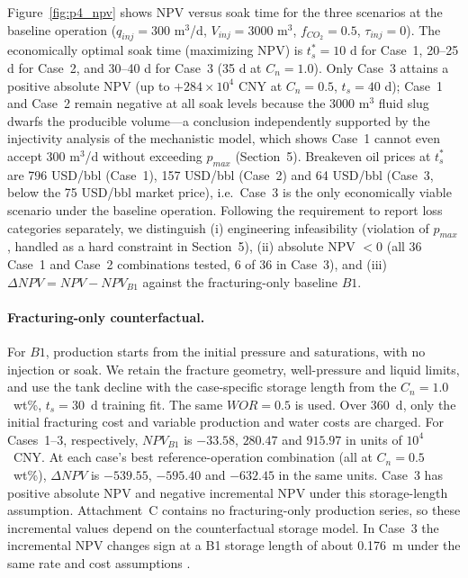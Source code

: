 Figure~\ref{fig:p4_npv} shows NPV versus soak time for the three scenarios
at the baseline operation ($q_{inj}=300$ m$^3$/d, $V_{inj}=3000$ m$^3$,
$f_{CO_2}=0.5$, $\tau_{inj}=0$). The economically optimal soak time
(maximizing NPV) is $t_s^* = 10$ d for Case~1, 20--25 d for Case~2, and
30--40 d for Case~3 (35 d at $C_n=1.0$). Only Case~3 attains a positive
absolute NPV (up to $+284\times10^4$ CNY at $C_n=0.5$, $t_s=40$ d);
Case~1 and Case~2 remain negative at all soak levels because the 3000 m$^3$
fluid slug dwarfs the producible volume---a conclusion independently
supported by the injectivity analysis of the mechanistic model, which shows
Case~1 cannot even accept 300 m$^3$/d without exceeding $p_{max}$
(Section~5). Breakeven oil prices at $t_s^*$ are 796 USD/bbl (Case~1),
157 USD/bbl (Case~2) and 64 USD/bbl (Case~3, below the 75 USD/bbl market
price), i.e.\ Case~3 is the only economically viable scenario under the
baseline operation. Following the requirement to report loss categories
separately, we distinguish (i) engineering infeasibility (violation of
$p_{max}$, handled as a hard constraint in Section~5), (ii) absolute
NPV $<0$ (all 36 Case~1 and Case~2 combinations tested, 6 of 36 in
Case~3), and (iii) $\Delta NPV = NPV - NPV_{B1}$ against the
fracturing-only baseline $B1$.

\paragraph{Fracturing-only counterfactual.}
For $B1$, production starts from the initial pressure and saturations,
with no injection or soak. We retain the fracture geometry, well-pressure
and liquid limits, and use the tank decline with the case-specific
storage length from the $C_n=1.0$~wt\%, $t_s=30$~d training fit.
The same $WOR=0.5$ is used. Over 360~d, only the initial fracturing
cost and variable production and water costs are charged.
For Cases~1--3, respectively, $NPV_{B1}$ is $-33.58$, $280.47$ and $915.97$
in units of $10^4$~CNY. At each case's best reference-operation combination
(all at $C_n=0.5$~wt\%), $\Delta NPV$ is $-539.55$, $-595.40$ and $-632.45$
in the same units. Case~3 has positive absolute NPV and negative
incremental NPV under this storage-length assumption. Attachment~C
contains no fracturing-only production series, so these incremental
values depend on the counterfactual storage model. In Case~3 the incremental NPV changes sign at a B1 storage length of about 0.176~m under the same rate and cost assumptions \cite{codex}.

